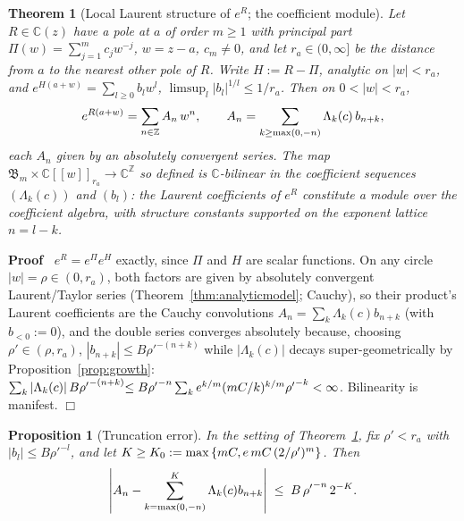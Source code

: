 \documentclass{article}
\newcommand{\assign}{:=}
\newenvironment{proof}{\noindent\textbf{Proof\ }}{\hspace*{\fill}$\Box$\medskip}
\newtheorem{proposition}{Proposition}
{\theorembodyfont{\rmfamily}\newtheorem{remark}{Remark}}
\newtheorem{theorem}{Theorem}
\newcommand{\CA}{\mathfrak{B}}
\newcommand{\C}{\mathbb{C}}
\newcommand{\Z}{\mathbb{Z}}
\begin{document}
\begin{theorem}
  [Local Laurent structure of $e^R$; the coefficient module]\label{thm:module}
  Let $R \in \C (z)$ have a pole at $a$ of order $m \ge 1$ with principal part
  $\Pi (w) = \sum_{j = 1}^m c_j w^{- j}$, $w = z - a$, $c_m \ne 0$, and let
  $r_a \in (0, \infty]$ be the distance from $a$ to the nearest other pole of
  $R$. Write $H \assign R - \Pi$, analytic on $|w| < r_a$, and $e^{H (a + w)}
  = \sum_{l \ge 0} b_l w^l$, $\limsup_l |b_l |^{1 / l} \le 1 / r_a$. Then on
  $0 < |w| < r_a$,
  \[ e^{R (a + w)} = \sum_{n \in \Z} A_n  \hspace{0.17em} w^n, \qquad A_n =
     \sum_{k \ge \max (0, - n)} \Lambda_k (c)  \hspace{0.17em} b_{n + k}, \]
  each $A_n$ given by an absolutely convergent series. The map $\CA_m \times
  \C [[w]]_{r_a} \to \C^{\Z}$ so defined is $\C$-bilinear in the coefficient
  sequences $(\Lambda_k (c))$ and $(b_l)$: the Laurent coefficients of $e^R$
  constitute a module over the coefficient algebra, with structure constants
  supported on the exponent lattice $n = l - k$.
\end{theorem}

\begin{proof}
  $e^R = e^{\Pi} e^H$ exactly, since $\Pi$ and $H$ are scalar functions. On
  any circle $|w| = \rho \in (0, r_a)$, both factors are given by absolutely
  convergent Laurent/Taylor series (Theorem~\ref{thm:analyticmodel}; Cauchy),
  so their product's Laurent coefficients are the Cauchy convolutions $A_n =
  \sum_k \Lambda_k (c) b_{n + k}$ (with $b_{< 0} \assign 0$), and the double
  series converges absolutely because, choosing $\rho' \in (\rho, r_a)$,
  $|b_{n + k} | {\le B \rho'}^{- (n + k)}$ while $| \Lambda_k (c) |$ decays
  super-geometrically by Proposition~\ref{prop:growth}: $\sum_k | \Lambda_k
  (c) |  \hspace{0.17em} {B \rho'}^{- (n + k)} {\le B \rho'}^{- n}  \sum_k
  e^{k / m}  (mC / k)^{k / m} {\rho'}^{- k} < \infty$. Bilinearity is
  manifest.
\end{proof}

\begin{proposition}
  [Truncation error]\label{prop:tail} In the setting of
  Theorem~\ref{thm:module}, fix $\rho' < r_a$ with $|b_l | {\le B \rho'}^{-
  l}$, and let $K \ge K_0 \assign \max \left\{ mC, e \hspace{0.17em} mC
  \hspace{0.17em} (2 / \rho')^m \right\}$. Then
  \[ \left| A_n - \sum_{k = \max (0, - n)}^K \Lambda_k (c) b_{n + k} \right|
     \hspace{0.27em} \le \hspace{0.27em} B \hspace{0.17em} {\rho'}^{- n} 
     \hspace{0.17em} 2^{- K} . \]
\end{proposition}
\end{document}
